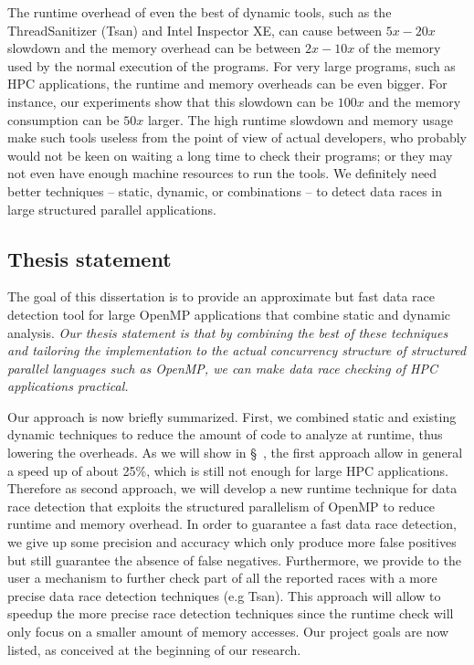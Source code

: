 The runtime overhead of even the best of dynamic tools, such as the
ThreadSanitizer (Tsan) and Intel Inspector XE, can cause between $5x-20x$
slowdown and the memory overhead can be between $2x-10x$ of the memory used by
the normal execution of the programs.
%
For very large programs, such as HPC applications, the runtime and memory
overheads can be even bigger.
%
For instance, our experiments show that this slowdown can be $100x$
and the memory consumption can be $50x$ larger.
%
The high runtime slowdown and memory usage make such tools useless from the
point of view of actual developers, who probably would not be keen on waiting
a long time to check their programs; or they may not even have enough machine
resources to run the tools.
%
We definitely need better techniques -- static, dynamic, or combinations -- to
detect data races in large structured parallel applications.

\subsection{Thesis statement}
\label{subsec:statement}

The goal of this dissertation is to provide an approximate but fast data race
detection tool for large OpenMP applications that combine static and dynamic
analysis.
%
\emph{Our thesis statement is that by combining the best of these techniques
  and tailoring the implementation to the actual concurrency structure of
  structured parallel languages such as OpenMP, we can make data race checking
  of HPC applications practical.}

Our approach is now briefly summarized.
%
First, we combined static and existing dynamic techniques to reduce the amount
of code to analyze at runtime, thus lowering the overheads.
%
As we will show in \S~\pageref{sec:accomplishedwork}, the first approach allow
in general a speed up of about 25\%, which is still not enough for large HPC
applications.
%
Therefore as second approach, we will develop a new runtime technique for data
race detection that exploits the structured parallelism of OpenMP to reduce
runtime and memory overhead.
%
In order to guarantee a fast data race detection, we give up some precision
and accuracy which only produce more false positives but still guarantee the
absence of false negatives.
%
Furthermore, we provide to the user a mechanism to further check part of all
the reported races with a more precise data race detection techniques (e.g
Tsan).
%
This approach will allow to speedup the more precise race detection
techniques since the runtime check will only focus on a smaller amount of
memory accesses.
%
Our project goals are now listed, as conceived at the beginning of our
research.

